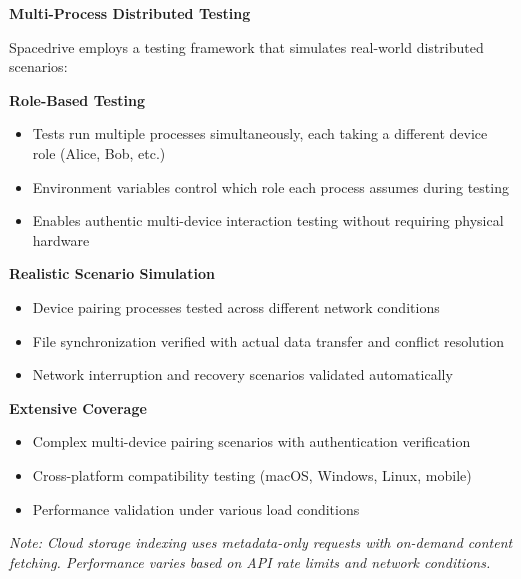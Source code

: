 \documentclass[sigconf]{acmart}
\begin{document}
\textbf{Multi-Process Distributed Testing}

Spacedrive employs a testing framework that simulates real-world distributed scenarios:

\textbf{Role-Based Testing}
\begin{itemize}[noitemsep, topsep=0pt]
 \item Tests run multiple processes simultaneously, each taking a different device role (Alice, Bob, etc.)
 \item Environment variables control which role each process assumes during testing
 \item Enables authentic multi-device interaction testing without requiring physical hardware
\end{itemize}

\textbf{Realistic Scenario Simulation}
\begin{itemize}[noitemsep, topsep=0pt]
 \item Device pairing processes tested across different network conditions
 \item File synchronization verified with actual data transfer and conflict resolution
 \item Network interruption and recovery scenarios validated automatically
\end{itemize}

\textbf{Extensive Coverage}
\begin{itemize}[noitemsep, topsep=0pt]
 \item Complex multi-device pairing scenarios with authentication verification
 \item Cross-platform compatibility testing (macOS, Windows, Linux, mobile)
 \item Performance validation under various load conditions
\end{itemize}



\textit{Note: Cloud storage indexing uses metadata-only requests with on-demand content fetching. Performance varies based on API rate limits and network conditions.}
\end{document}
